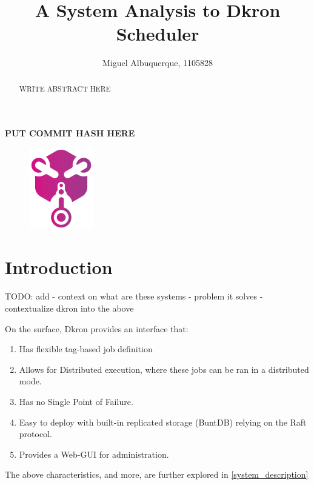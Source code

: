 \documentclass[runningheads]{llncs}
\begin{document}
%
\title{A System Analysis to Dkron Scheduler}


%
%
\author{Miguel Albuquerque, 1105828}
%
\maketitle              %
%
\begin{abstract}
WRITE ABSTRACT HERE
\end{abstract}

\par
{}
\par
{}\textbf{PUT COMMIT HASH HERE}

%
%
%
\begin{figure}
\centering
\includegraphics[width=0.25\textwidth]{media/dkron-logo.png}
\end{figure}
\section{Introduction}
TODO: add
- context on what are these systems
- problem it solves
- contextualize dkron into the above

On the surface, Dkron provides an interface that:
\begin{enumerate}
    \item Has flexible tag-based job definition
    \item Allows for Distributed execution, where these jobs can be ran in a distributed mode. %
    \item Has no Single Point of Failure.
    \item Easy to deploy with built-in replicated storage (BuntDB) relying on the Raft protocol.
    \item Provides a Web-GUI for administration.
\end{enumerate}
The above characteristics, and more, are further explored in \ref{system_description}
\end{document}

